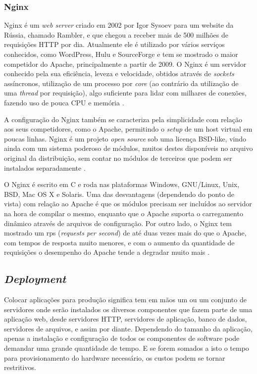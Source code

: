 \documentclass[diss]{template/setrem}
\begin{document}
\subsubsection{Nginx}
Nginx é um \emph{web server} criado em 2002 por Igor Sysoev para um website da Rússia, chamado Rambler, e que chegou a receber mais de 500 milhões de requisições HTTP por dia. Atualmente ele é utilizado por vários serviços conhecidos, como WordPress, Hulu e SourceForge e tem se mostrado o maior competidor do Apache, principalmente a partir de 2009. O Nginx é um servidor conhecido pela sua eficiência, leveza e velocidade, obtidos através de \emph{sockets} assíncronos, utilização de um processo por \emph{core} (ao contrário da utilização de uma \emph{thread} por requisição), algo suficiente para lidar com milhares de conexões, fazendo uso de pouca CPU e memória \citep{Nedelcu2009}.

A configuração do Nginx também se caracteriza pela simplicidade com relação aos seus competidores, como o Apache, permitindo o \emph{setup} de um host virtual em poucas linhas. Nginx é um projeto \emph{open source} sob uma licença BSD-like, vindo ainda com um sistema poderoso de módulos, muitos destes disponíveis no arquivo original da distribuição, sem contar no módulos de terceiros que podem ser instalados separadamente \citep{Nedelcu2009}.

O Nginx é escrito em C e roda nas plataformas Windows, GNU/Linux, Unix, BSD, Mac OS X e Solaris. Uma das desvantagens (dependendo do ponto de vista) com relação ao Apache é que os módulos precisam ser incluídos ao servidor na hora de compilar o mesmo, enquanto que o Apache suporta o carregamento dinâmico através de arquivos de configuração. Por outro lado, o Nginx tem mostrado um rps (\emph{requests per second}) de até duas vezes mais do que o Apache, com tempos de resposta muito menores, e com o aumento da quantidade de requisições o desempenho do Apache tende a degradar muito mais \citep{Nedelcu2009}.

\subsection{\textit{Deployment}}
Colocar aplicações para produção significa tem em mãos um ou um conjunto de servidores onde serão instalados os diversos componentes que fazem parte de uma aplicação web, desde servidores HTTP, servidores de aplicação, banco de dados, servidores de arquivos, e assim por diante. Dependendo do tamanho da aplicação, apenas a instalação e configuração de todos os componentes de software pode demandar uma grande quantidade de tempo. E se forem somados a isto o tempo para provisionamento do hardware necessário, os custos podem se tornar restritivos.
\end{document}
